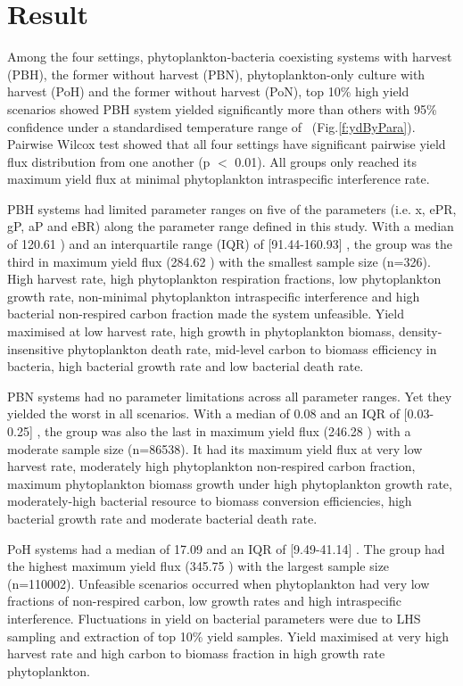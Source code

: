 \documentclass[../thesis.tex]{subfiles} %
\begin{document}
\section{Result}
Among the four settings, phytoplankton-bacteria coexisting systems with harvest (PBH), the former without harvest (PBN), phytoplankton-only culture with harvest (PoH) and the former without harvest (PoN), top 10\% high yield scenarios showed PBH system yielded significantly more than others with 95\% confidence under a standardised temperature range of \temp\ (Fig.\ref{f:ydByPara}).  Pairwise Wilcox test showed that all four settings have significant pairwise yield flux distribution from one another (p $<$ 0.01).  All groups only reached its maximum yield flux at minimal phytoplankton intraspecific interference rate.

PBH systems had limited parameter ranges on five of the parameters (i.e. x, ePR, gP, aP and eBR) along the parameter range defined in this study.  With a median of 120.61 \dxdt) and an interquartile range (IQR) of [91.44-160.93] \dxdt, the group was the third in maximum yield flux (284.62 \dxdt) with the smallest sample size (n=326).  High harvest rate, high phytoplankton respiration fractions, low phytoplankton growth rate, non-minimal phytoplankton intraspecific interference and high bacterial non-respired carbon fraction made the system unfeasible.  Yield maximised at low harvest rate, high growth in phytoplankton biomass, density-insensitive phytoplankton death rate, mid-level carbon to biomass efficiency in bacteria, high bacterial growth rate and low bacterial death rate.

PBN systems had no parameter limitations across all parameter ranges.  Yet they yielded the worst in all scenarios.  With a median of 0.08 \dxdt and an IQR of [0.03-0.25] \dxdt, the group was also the last in maximum yield flux (246.28 \dxdt) with a moderate sample size (n=86538).  It had its maximum yield flux at very low harvest rate, moderately high phytoplankton non-respired carbon fraction, maximum phytoplankton biomass growth under high phytoplankton growth rate, moderately-high bacterial resource to biomass conversion efficiencies, high bacterial growth rate and moderate bacterial death rate.  

PoH systems had a median of 17.09 \dxdt and an IQR of [9.49-41.14] \dxdt.  The group had the highest maximum yield flux (345.75 \dxdt) with the largest sample size (n=110002).  Unfeasible scenarios occurred when phytoplankton had very low fractions of non-respired carbon, low growth rates and high intraspecific interference.  Fluctuations in yield on bacterial parameters were due to LHS sampling and extraction of top 10\% yield samples.  Yield maximised at very high harvest rate and high carbon to biomass fraction in high growth rate phytoplankton.
\end{document}
